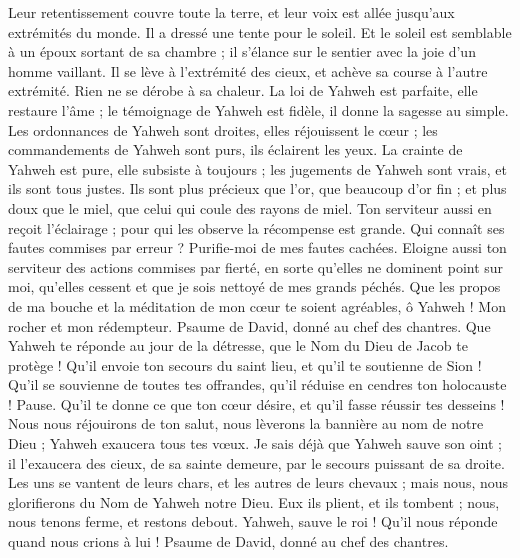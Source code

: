 \begin{multicols}{2}
Leur retentissement couvre toute la terre, et leur voix est allée jusqu'aux extrémités du monde. Il a dressé une tente pour le soleil.
Et le soleil est semblable à un époux sortant de sa chambre ; il s’élance sur le sentier avec la joie d’un homme vaillant.
Il se lève à l’extrémité des cieux, et achève sa course à l’autre extrémité. Rien ne se dérobe à sa chaleur.
La loi de Yahweh est parfaite, elle restaure l'âme ; le témoignage de Yahweh est fidèle, il donne la sagesse au simple.
Les ordonnances de Yahweh sont droites, elles réjouissent le cœur ; les commandements de Yahweh sont purs, ils éclairent les yeux.
La crainte de Yahweh est pure, elle subsiste à toujours ; les jugements de Yahweh sont vrais, et ils sont tous justes.
Ils sont plus précieux que l'or, que beaucoup d’or fin ; et plus doux que le miel, que celui qui coule des rayons de miel.
Ton serviteur aussi en reçoit l’éclairage ; pour qui les observe la récompense est grande.
Qui connaît ses fautes commises par erreur ? Purifie-moi de mes fautes cachées.
Eloigne aussi ton serviteur des actions commises par fierté, en sorte qu'elles ne dominent point sur moi, qu’elles cessent et que je sois nettoyé de mes grands péchés.
Que les propos de ma bouche et la méditation de mon cœur te soient agréables, ô Yahweh ! Mon rocher et mon rédempteur.
\VerseOne{}Psaume de David, donné au chef des chantres.
Que Yahweh te réponde au jour de la détresse, que le Nom du Dieu de Jacob te protège !
Qu'il envoie ton secours du saint lieu, et qu'il te soutienne de Sion !
Qu'il se souvienne de toutes tes offrandes, qu'il réduise en cendres ton holocauste ! Pause.
Qu'il te donne ce que ton cœur désire, et qu'il fasse réussir tes desseins !
Nous nous réjouirons de ton salut, nous lèverons la bannière au nom de notre Dieu ; Yahweh exaucera tous tes vœux.
Je sais déjà que Yahweh sauve son oint ; il l’exaucera des cieux, de sa sainte demeure, par le secours puissant de sa droite.
Les uns se vantent de leurs chars, et les autres de leurs chevaux ; mais nous, nous glorifierons du Nom de Yahweh notre Dieu.
Eux ils plient, et ils tombent ; nous, nous tenons ferme, et restons debout.
Yahweh, sauve le roi ! Qu’il nous réponde quand nous crions à lui !
\VerseOne{}Psaume de David, donné au chef des chantres.

\end{multicols}
